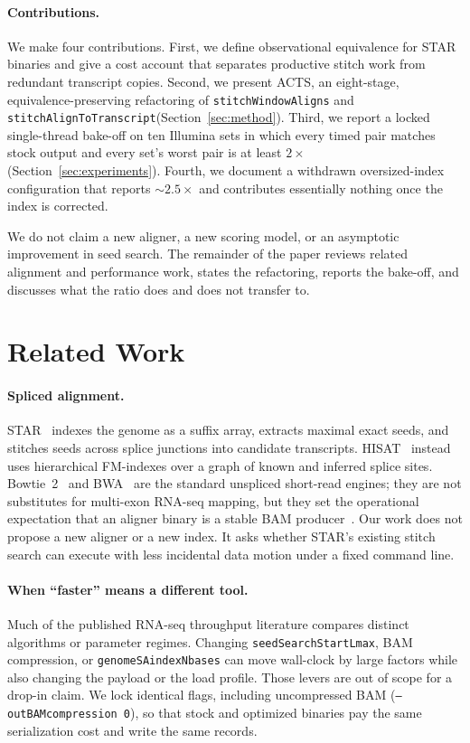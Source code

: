 \documentclass[11pt]{article}
\newcommand{\STAR}{STAR\xspace}
\newcommand{\ACTS}{ACTS\xspace}
\newcommand{\swa}{\texttt{stitchWindowAligns}\xspace}
\newcommand{\sat}{\texttt{stitchAlignToTranscript}\xspace}
\begin{document}
\paragraph{Contributions.}
We make four contributions.
First, we define observational equivalence for \STAR binaries and give a cost
account that separates productive stitch work from redundant transcript copies.
Second, we present \ACTS, an eight-stage, equivalence-preserving refactoring of
\swa and \sat (Section~\ref{sec:method}).
Third, we report a locked single-thread bake-off on ten Illumina sets in which
every timed pair matches stock output and every set's worst pair is at least
$2\times$ (Section~\ref{sec:experiments}).
Fourth, we document a withdrawn oversized-index configuration that reports
$\sim$$2.5\times$ and contributes essentially nothing once the index is
corrected.

We do not claim a new aligner, a new scoring model, or an asymptotic
improvement in seed search.
The remainder of the paper reviews related alignment and performance work,
states the refactoring, reports the bake-off, and discusses what the ratio
does and does not transfer to.

\section{Related Work}
\label{sec:related}

\paragraph{Spliced alignment.}
\STAR~\cite{dobin2013star,dobin2015mapping} indexes the genome as a suffix array,
extracts maximal exact seeds, and stitches seeds across splice junctions into
candidate transcripts.
HISAT~\cite{kim2015hisat} instead uses hierarchical FM-indexes over a graph of
known and inferred splice sites.
Bowtie~2~\cite{langmead2012bowtie2} and BWA~\cite{li2009bwa} are the standard
unspliced short-read engines; they are not substitutes for multi-exon RNA-seq
mapping, but they set the operational expectation that an aligner binary is a
stable BAM producer~\cite{li2011samtools}.
Our work does not propose a new aligner or a new index.
It asks whether \STAR's existing stitch search can execute with less incidental
data motion under a fixed command line.

\paragraph{When ``faster'' means a different tool.}
Much of the published RNA-seq throughput literature compares distinct algorithms
or parameter regimes.
Changing \texttt{seedSearchStartLmax}, BAM compression, or
\texttt{genomeSAindexNbases} can move wall-clock by large factors while also
changing the payload or the load profile.
Those levers are out of scope for a drop-in claim.
We lock identical flags, including uncompressed BAM
(\texttt{--outBAMcompression 0}), so that stock and optimized binaries pay the
same serialization cost and write the same records.
\end{document}
